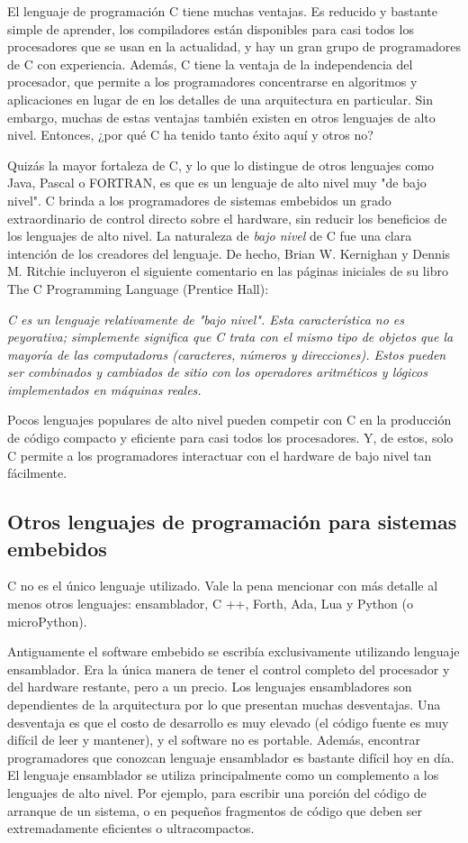 \documentclass[output=paper, 
colorlinks,
citecolor=brown,
newtxmath
]{langscibook}
\begin{document}
El lenguaje de programación C tiene muchas ventajas. 
Es reducido y bastante simple de aprender, los compiladores están disponibles 
para casi todos los procesadores que se usan en la actualidad, y hay un 
gran grupo de programadores de C con experiencia. 
Además, C tiene la ventaja de la independencia del procesador, 
que permite a los programadores concentrarse en algoritmos y aplicaciones 
en lugar de en los detalles de una arquitectura en particular. 
Sin embargo, muchas de estas ventajas también existen 
en otros lenguajes de alto nivel. Entonces, ¿por qué C ha tenido 
tanto éxito aquí y otros no?

Quizás la mayor fortaleza de C, y lo que lo distingue de otros lenguajes 
como Java, Pascal o FORTRAN, es que es un lenguaje de alto nivel 
muy "de bajo nivel". 
C brinda a los programadores de sistemas embebidos un grado 
extraordinario de control directo sobre el hardware, sin 
reducir los beneficios de los lenguajes de alto nivel. 
La naturaleza de \textit{bajo nivel} de C fue una clara intención 
de los creadores del lenguaje. De hecho, Brian W. Kernighan y Dennis M. 
Ritchie incluyeron el siguiente comentario en las páginas 
iniciales de su libro The C Programming Language (Prentice Hall):

\textit{C es un lenguaje relativamente de "bajo nivel". Esta característica no es peyorativa; 
simplemente significa que C trata con el mismo tipo de objetos 
que la mayoría de las computadoras (caracteres, números y direcciones). 
Estos pueden ser combinados y cambiados de sitio con los operadores
aritméticos y lógicos implementados en máquinas reales.}

Pocos lenguajes populares de alto nivel pueden competir con C 
en la producción de código compacto y eficiente para casi 
todos los procesadores. Y, de estos, solo C permite a los 
programadores interactuar con el hardware de bajo nivel tan fácilmente.




\subsection {Otros lenguajes de programación para sistemas embebidos}

C no es el único lenguaje utilizado. Vale la pena mencionar con 
más detalle al menos otros lenguajes: ensamblador, C ++, Forth, Ada, Lua y Python (o microPython).

Antiguamente el software embebido se escribía exclusivamente utilizando lenguaje ensamblador.
Era la única manera de tener el control completo del procesador y del hardware restante, pero a un precio.
Los lenguajes ensambladores son dependientes de la arquitectura por lo que presentan muchas desventajas. 
Una desventaja es que el costo de desarrollo es muy elevado (el código fuente es muy 
difícil de leer y mantener), y el software no es portable. 
Además, encontrar programadores que conozcan lenguaje ensamblador es bastante difícil hoy en día.
El lenguaje ensamblador se utiliza principalmente como un complemento a los lenguajes de
alto nivel. Por ejemplo, para escribir una porción del código de arranque de un sistema,
o en pequeños fragmentos de código que deben ser extremadamente eficientes o ultracompactos.
\end{document}
